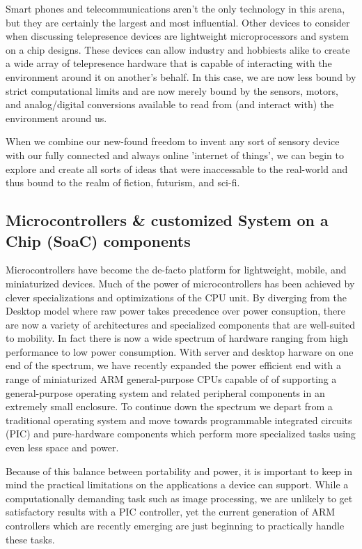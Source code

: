 \documentclass[final,a4paper,12pt]{report}
\begin{document}
Smart phones and telecommunications aren't the only technology in this arena, but they are certainly the largest and most influential. Other devices to consider when discussing telepresence devices are lightweight microprocessors and system on a chip designs. These devices can allow industry and hobbiests alike to create a wide array of telepresence hardware that is capable of interacting with the environment around it on another's behalf. In this case, we are now less bound by strict computational limits and are now merely bound by the sensors, motors, and analog/digital conversions available to read from (and interact with) the environment around us.

When we combine our new-found freedom to invent any sort of sensory device with our fully connected and always online 'internet of things', we can begin to explore and create all sorts of ideas that were inaccessable to the real-world and thus bound to the realm of fiction, futurism, and sci-fi.
\subsection{Microcontrollers \& customized System on a Chip (SoaC) components}

Microcontrollers have become the de-facto platform for lightweight, mobile, and miniaturized devices. Much of the power of microcontrollers has been achieved by clever specializations and optimizations of the CPU unit. By diverging from the Desktop model where raw power takes precedence over power consuption, there are now a variety of architectures and specialized components that are well-suited to mobility. In fact there is now a wide spectrum of hardware ranging from high performance to low power consumption. With server and desktop harware on one end of the spectrum, we have recently expanded the power efficient end with a range of miniaturized ARM general-purpose CPUs capable of of supporting a general-purpose operating system and related peripheral components in an extremely small enclosure. To continue down the spectrum we depart from a traditional operating system and move towards programmable integrated circuits (PIC) and pure-hardware components which perform more specialized tasks using even less space and power.

Because of this balance between portability and power, it is important to keep in mind the practical limitations on the applications a device can support. While a computationally demanding task such as image processing, we are unlikely to get satisfactory results with a PIC controller, yet the current generation of ARM controllers which are recently emerging are just beginning to practically handle these tasks.
\end{document}
